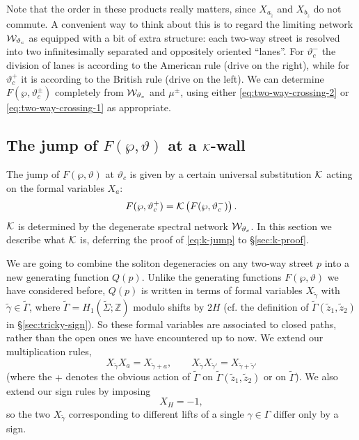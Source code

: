 \documentclass[11pt,a4paper]{article}
\def\IZ{{\mathbb{Z}}}
\def\wnet {{\cal W}}
\def\cK{{\cal K}}
\def\tz{{\tilde z}}
\def\IZ{{\mathbb{Z}}}
\def\wnet {{\cal W}}
\begin{document}
Note that the order in these products really matters, since $X_{a_{\tilde z}}$ and $X_{b_{\tilde z}}$ do not
commute.
A convenient way to think about this is to regard the limiting network
$\wnet_{\vartheta_c}$ as equipped with a bit of extra structure:  each two-way street is
resolved into two infinitesimally separated and oppositely oriented ``lanes''.
For $\vartheta_c^-$ the division of lanes is according to the American rule (drive on the right),
while for $\vartheta_c^+$ it is according to the British rule (drive on the left).
We can determine $F(\wp, \vartheta_c^\pm)$ completely
from $\wnet_{\vartheta_c}$ and $\mu^\pm$,
using either \eqref{eq:two-way-crossing-2} or \eqref{eq:two-way-crossing-1} as appropriate.



\subsection{The jump of $F(\wp, \vartheta)$ at a $\cK$-wall} \label{sec:f-jump}

The jump of $F(\wp, \vartheta)$ at $\vartheta_c$ is given by a certain universal substitution $\cK$ acting on the formal variables $X_a$:
\begin{equation} \label{eq:k-jump}
F(\wp, \vartheta_c^+) = \cK\left(F(\wp, \vartheta_c^-)\right).
\end{equation}
$\cK$ is determined by the degenerate spectral network $\wnet_{\vartheta_c}$.
In this section we describe what $\cK$ is,
deferring the proof of \eqref{eq:k-jump} to \S\ref{sec:k-proof}.

We are going to
combine the soliton degeneracies on any two-way street $p$ into a new generating function $Q(p)$.
Unlike the generating functions $F(\wp, \vartheta)$ we have considered before, $Q(p)$ is
written in terms of formal variables $X_{\tilde \gamma}$
with $\tilde\gamma \in \tilde\Gamma$,
where $\tilde\Gamma = H_1(\tilde\Sigma; \IZ)$ modulo shifts by $2H$ (cf. the definition of
$\tilde\Gamma(\tz_1, \tz_2)$ in \S\ref{sec:tricky-sign}).
So these formal variables are associated to closed paths, rather than the open ones we have
encountered up to now.
We extend our multiplication rules,
\begin{equation}
 X_{\tilde \gamma} X_a = X_{\tilde \gamma + a}, \qquad X_{\tilde \gamma} X_{\tilde \gamma'} = X_{\tilde \gamma + \tilde \gamma'}
\end{equation}
(where the $+$ denotes the obvious action of $\tilde\Gamma$ on $\tilde\Gamma(\tz_1, \tz_2)$ or on $\tilde\Gamma$).
We also extend our sign rules by imposing
\begin{equation}
 X_H = -1,
\end{equation}
so the two $X_{\tilde\gamma}$ corresponding to different lifts of a single $\gamma \in \Gamma$ differ only by a sign.
\end{document}
